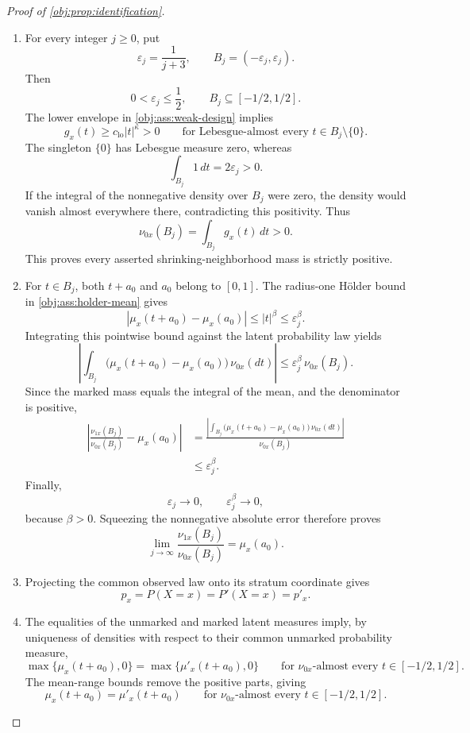 \documentclass[11pt]{article}
\begin{document}
\begin{proof}[Proof of \cref{obj:prop:identification}]
\begin{enumerate}
\item For every integer \(j\ge0\), put
\[
\varepsilon_j=\frac1{j+3},
\qquad
B_j=(-\varepsilon_j,\varepsilon_j).
\]
Then
\[
0<\varepsilon_j\le\frac12,
\qquad
B_j\subseteq[-1/2,1/2].
\]
The lower envelope in \cref{obj:ass:weak-design} implies
\[
g_x(t)\ge c_{\mathrm{lo}}|t|^\kappa>0
\qquad
\text{for Lebesgue-almost every }t\in B_j\setminus\{0\}.
\]
The singleton \(\{0\}\) has Lebesgue measure zero, whereas
\[
\int_{B_j}1\,dt=2\varepsilon_j>0.
\]
If the integral of the nonnegative density over \(B_j\) were zero, the density would vanish almost everywhere there, contradicting this positivity. Thus
\[
\nu_{0x}(B_j)=\int_{B_j}g_x(t)\,dt>0.
\]
This proves every asserted shrinking-neighborhood mass is strictly positive.

\item For \(t\in B_j\), both \(t+a_0\) and \(a_0\) belong to \([0,1]\). The radius-one Hölder bound in \cref{obj:ass:holder-mean} gives
\[
|\mu_x(t+a_0)-\mu_x(a_0)|
\le |t|^\beta
\le\varepsilon_j^\beta.
\]
Integrating this pointwise bound against the latent probability law yields
\[
\left|
\int_{B_j}\bigl(\mu_x(t+a_0)-\mu_x(a_0)\bigr)\,\nu_{0x}(dt)
\right|
\le\varepsilon_j^\beta\,\nu_{0x}(B_j).
\]
Since the marked mass equals the integral of the mean, and the denominator is positive,
\[
\begin{aligned}
\left|
\frac{\nu_{1x}(B_j)}{\nu_{0x}(B_j)}-\mu_x(a_0)
\right|
&=
\frac{
\left|\displaystyle\int_{B_j}
\bigl(\mu_x(t+a_0)-\mu_x(a_0)\bigr)\,\nu_{0x}(dt)\right|
}{\nu_{0x}(B_j)}\\
&\le\varepsilon_j^\beta.
\end{aligned}
\]
Finally,
\[
\varepsilon_j\longrightarrow0,
\qquad
\varepsilon_j^\beta\longrightarrow0,
\]
because \(\beta>0\). Squeezing the nonnegative absolute error therefore proves
\[
\lim_{j\to\infty}\frac{\nu_{1x}(B_j)}{\nu_{0x}(B_j)}
=\mu_x(a_0).
\]

\item Projecting the common observed law onto its stratum coordinate gives
\[
p_x=P(X=x)=P'(X=x)=p'_x.
\]

\item The equalities of the unmarked and marked latent measures imply, by uniqueness of densities with respect to their common unmarked probability measure,
\[
\max\{\mu_x(t+a_0),0\}
=\max\{\mu'_x(t+a_0),0\}
\qquad
\text{for }\nu_{0x}\text{-almost every }t\in[-1/2,1/2].
\]
The mean-range bounds remove the positive parts, giving
\[
\mu_x(t+a_0)=\mu'_x(t+a_0)
\qquad
\text{for }\nu_{0x}\text{-almost every }t\in[-1/2,1/2].
\]


\end{enumerate}
\end{proof}
\end{document}
